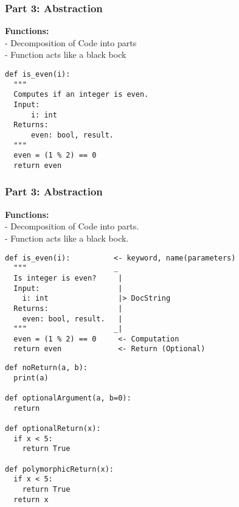 \documentclass{beamer}
\begin{document}




\begin{frame}[fragile]
    \frametitle{\textbf{Part 3:} Abstraction}
    \textbf{Functions:}\\
    - Decomposition of Code into parts\\
    - Function acts like a black bock
    \begin{verbatim}
def is_even(i):
  """
  Computes if an integer is even.
  Input:
      i: int
  Returns:
      even: bool, result.
  """
  even = (1 % 2) == 0
  return even
\end{verbatim}
\end{frame}

\begin{frame}[fragile]
    \frametitle{\textbf{Part 3:} Abstraction}
    \textbf{Functions:}\\
    - Decomposition of Code into parts.\\
    - Function acts like a black bock.
    \begin{verbatim}
def is_even(i):          <- keyword, name(parameters)
  """                    _
  Is integer is even?     |
  Input:                  |
    i: int                |> DocString
  Returns:                |
    even: bool, result.   |
  """                    _|
  even = (1 % 2) == 0     <- Computation
  return even             <- Return (Optional)
    \end{verbatim}
\end{frame}


\begin{frame}[fragile]
    \begin{example}
\begin{verbatim}
def noReturn(a, b):
  print(a)

def optionalArgument(a, b=0):
  return

def optionalReturn(x):
  if x < 5:
    return True

def polymorphicReturn(x):
  if x < 5:
    return True
  return x
\end{verbatim}
    \end{example}
\end{frame}
\end{document}
